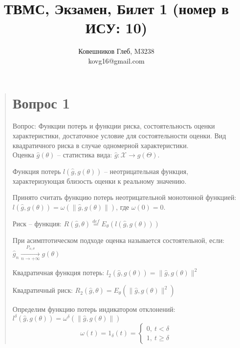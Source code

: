 \documentclass{article}
\begin{document}
\title{ТВМС, Экзамен, Билет 1 (номер в ИСУ: 10)}
\author{
	Ковешников Глеб, M3238\\
	kovg16@gmail.com
}
\maketitle

\begin{quote}
\section{Вопрос 1}
\large
Вопрос: Функции потерь и функции риска, состоятельность оценки характеристики,
  достаточное условие для состоятельности оценки. Вид квадратичного риска в случае
  одномерной характеристики.\\

Оценка $\hat{g}(\theta)$ -- статистика вида: $\hat{g} \colon \mathcal{X} \to g(\Theta)$.

Функция потерь $l(\hat{g}, g(\theta))$ -- неотрицательная функция,
характеризующая близость оценки к реальному значению.

Принято считать функцию потерь неотрицательной монотонной функцией: \\
$l(\hat{g}, g(\theta)) = \omega({\lVert}\hat{g}, g(\theta){\rVert})$, где $\omega(0) = 0$.

Риск -- функция:
$R(\hat{g}, \theta) \overset{def}{\underset{}{=}} E_{\theta}(l(\hat{g}, g(\theta)))$

При асимптотическом подходе оценка называется состоятельной, если:\\
$\hat{g}_n \xrightarrow[n \to +\infty]{P_{n, \theta}} g(\theta)$

Квадратичная функция потерь:
$l_2(\hat{g}, g(\theta)) = {\lVert}{\hat{g}, g(\theta)}{\rVert}^2$

Квадратичный риск:
$R_2(\hat{g}, \theta) = E_\theta({\lVert}{\hat{g}, g(\theta)}{\rVert}^2)$

Определим функцию потерь индикатором отклонений:\\
$l^\delta(\hat{g}, g(\theta)) = \omega^\delta({\lVert}{\hat{g}, g(\theta)}{\rVert})$
\begin{equation*}
  \omega(t) = 1_\delta(t) = \begin{cases}
    0,~ t < \delta  \\
    1,~ t \geqslant \delta
  \end{cases}
\end{equation*}


\end{quote}
\end{document}
